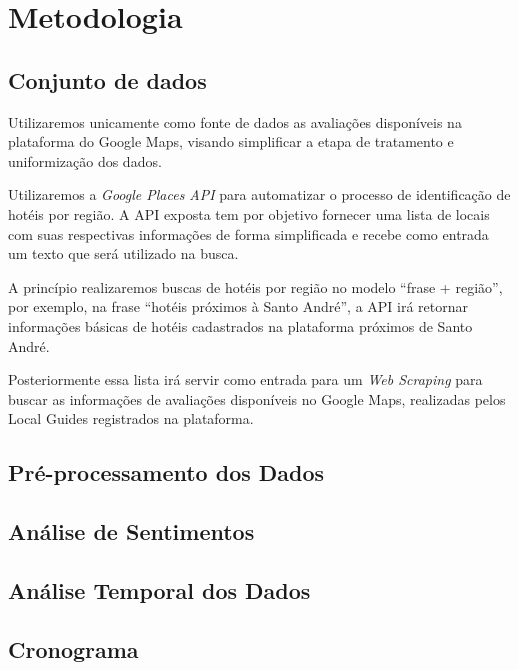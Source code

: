\chapter{Metodologia}
\label{cap:metodologia}

\section{Conjunto de dados}

Utilizaremos unicamente como fonte de dados as avaliações disponíveis na plataforma do Google Maps, visando simplificar a etapa de tratamento e uniformização dos dados.

Utilizaremos a \emph{Google Places API} para automatizar o processo de identificação de hotéis por região. A API exposta tem por objetivo fornecer uma lista de locais com suas respectivas informações de forma simplificada e recebe como entrada um texto que será utilizado na busca.

A princípio realizaremos buscas de hotéis por região no modelo “frase + região”, por exemplo, na frase “hotéis próximos à Santo André”, a API irá retornar informações básicas de hotéis cadastrados na plataforma próximos de Santo André.

Posteriormente essa lista irá servir como entrada para um \emph{Web Scraping} para buscar as informações de avaliações disponíveis no Google Maps, realizadas pelos Local Guides\cite{google2022localguides} registrados na plataforma.

\section{Pré-processamento dos Dados}



\section{Análise de Sentimentos}



\section{Análise Temporal dos Dados}



\section{Cronograma}
